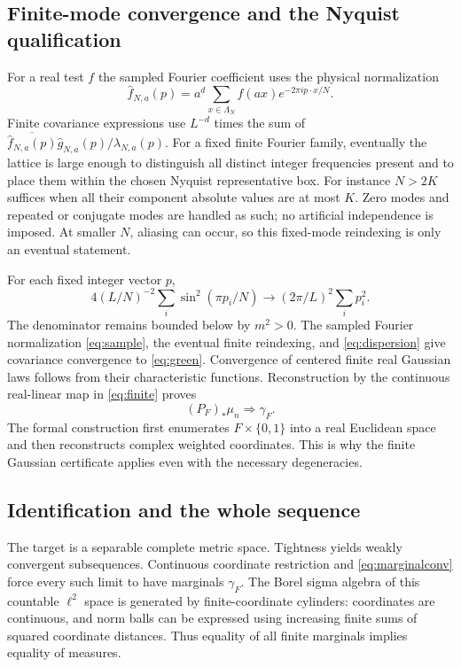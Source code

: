 \documentclass[11pt]{amsart}
\theoremstyle{remark}\newtheorem{remark}[theorem]{Remark}
\begin{document}
\subsection{Finite-mode convergence and the Nyquist qualification}
For a real test $f$ the sampled Fourier coefficient uses the physical normalization
\begin{equation}\label{eq:sample}
 \widehat f_{N,a}(p)=a^d\sum_{x\in\Lambda_N}f(ax)e^{-2\pi i p\cdot x/N}.
\end{equation}
Finite covariance expressions use $L^{-d}$ times the sum of
$\overline{\widehat f_{N,a}(p)}\widehat g_{N,a}(p)/\lambda_{N,a}(p)$.
For a fixed finite Fourier family, eventually the lattice is large enough to distinguish all distinct integer frequencies present and to place them within the chosen Nyquist representative box. For instance $N>2K$ suffices when all their component absolute values are at most $K$. Zero modes and repeated or conjugate modes are handled as such; no artificial independence is imposed. At smaller $N$, aliasing can occur, so this fixed-mode reindexing is only an eventual statement.

For each fixed integer vector $p$,
\begin{equation}\label{eq:dispersion}
 4(L/N)^{-2}\sum_i\sin^2(\pi p_i/N)
 \longrightarrow (2\pi/L)^2\sum_i p_i^2.
\end{equation}
The denominator remains bounded below by $m^2>0$. The sampled Fourier normalization \eqref{eq:sample}, the eventual finite reindexing, and \eqref{eq:dispersion} give covariance convergence to \eqref{eq:green}. Convergence of centered finite real Gaussian laws follows from their characteristic functions. Reconstruction by the continuous real-linear map in \eqref{eq:finite} proves
\begin{equation}\label{eq:marginalconv}
 (P_F)_*\mu_n\Longrightarrow\gamma_F.
\end{equation}
The formal construction first enumerates $F\times\{0,1\}$ into a real Euclidean space and then reconstructs complex weighted coordinates. This is why the finite Gaussian certificate applies even with the necessary degeneracies.

\subsection{Identification and the whole sequence}
The target is a separable complete metric space. Tightness yields weakly convergent subsequences. Continuous coordinate restriction and \eqref{eq:marginalconv} force every such limit to have marginals $\gamma_F$. The Borel sigma algebra of this countable $\ell^2$ space is generated by finite-coordinate cylinders: coordinates are continuous, and norm balls can be expressed using increasing finite sums of squared coordinate distances. Thus equality of all finite marginals implies equality of measures.
\end{document}
